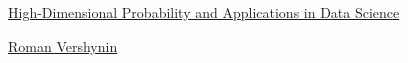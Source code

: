 \documentclass[11pt]{article}
\begin{document}
	\kaishu 
	\setcounter{section}{0}
	\begin{center}
		{\LARGE  \href{https://www.math.uci.edu/~rvershyn/teaching/hdp/hdp.html}{High-Dimensional Probability and Applications in Data Science}}
		
		
		{\large \href{https://www.math.uci.edu/~rvershyn/}{Roman Vershynin}}
	\end{center}
\setcounter{page}{1}



\vspace{-0.5cm}
\end{document}
